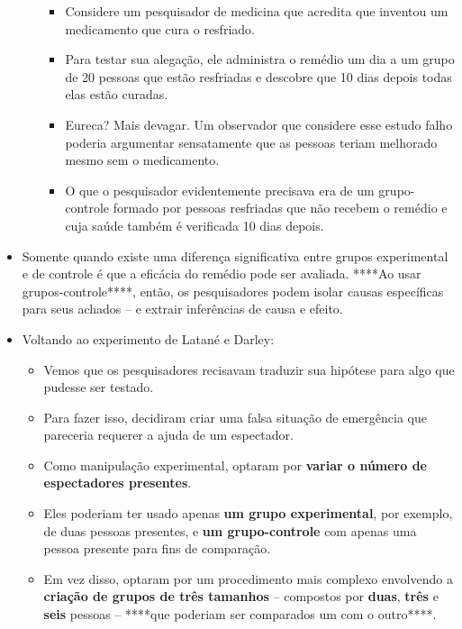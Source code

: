 \documentclass[
]{book}
\providecommand{\tightlist}{%
  \setlength{\itemsep}{0pt}\setlength{\parskip}{0pt}}
\begin{document}
\begin{itemize}
\begin{itemize}
    \begin{itemize}
    \tightlist
    \item
      Considere um pesquisador de medicina que acredita que inventou um medicamento que cura o resfriado.
    \item
      Para testar sua alegação, ele administra o remédio um dia a um grupo de 20 pessoas que estão resfriadas e descobre que 10 dias depois todas elas estão curadas.
    \item
      Eureca? Mais devagar. Um observador que considere esse estudo falho poderia argumentar sensatamente que as pessoas teriam melhorado mesmo sem o medicamento.
    \item
      O que o pesquisador evidentemente precisava era de um grupo-controle formado por pessoas resfriadas que não recebem o remédio e cuja saúde também é verificada 10 dias depois.
    \end{itemize}
  \end{itemize}
\item
  Somente quando existe uma diferença significativa entre grupos experimental e de controle é que a eficácia do remédio pode ser avaliada. ****Ao usar grupos-controle****, então, os pesquisadores podem isolar causas específicas para seus achados -- e extrair inferências de causa e efeito.
\item
  Voltando ao experimento de Latané e Darley:

  \begin{itemize}
  \tightlist
  \item
    Vemos que os pesquisadores recisavam traduzir sua hipótese para algo que pudesse ser testado.
  \item
    Para fazer isso, decidiram criar uma falsa situação de emergência que pareceria requerer a ajuda de um espectador.
  \item
    Como manipulação experimental, optaram por \textbf{variar o número de espectadores presentes}.
  \item
    Eles poderiam ter usado apenas \textbf{um grupo experimental}, por exemplo, de duas pessoas presentes, e \textbf{um grupo-controle} com apenas uma pessoa presente para fins de comparação.
  \item
    Em vez disso, optaram por um procedimento mais complexo envolvendo a \textbf{criação de grupos de três tamanhos} -- compostos por \textbf{duas}, \textbf{três} e \textbf{seis} pessoas -- ****que poderiam ser comparados um com o outro****.
  \end{itemize}
\end{itemize}
\end{document}
